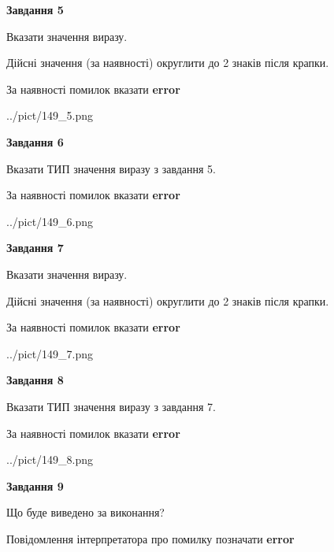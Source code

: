 \documentclass[11pt, ukrainian]{article}
\begin{document}
{\begin {large}
{\begin {center}\textbf{Завдання 5}\end {center}}\par
Вказати значення виразу. \par
Дійсні значення (за наявності) округлити до 2 знаків після крапки. \par
За наявності помилок вказати \textbf{error}

\begin{center}
	{../pict/149_5.png}
\end{center}
\newpage

{\begin {center}\textbf{Завдання 6}\end {center}}\par
Вказати ТИП значення виразу з завдання 5. \par
За наявності помилок вказати \textbf{error}

\begin{center}
	{../pict/149_6.png}
\end{center}
\newpage

{\begin {center}\textbf{Завдання 7}\end {center}}\par
Вказати значення виразу. \par
Дійсні значення (за наявності) округлити до 2 знаків після крапки. \par
За наявності помилок вказати \textbf{error}

\begin{center}
	{../pict/149_7.png}
\end{center}
\newpage

{\begin {center}\textbf{Завдання 8}\end {center}}\par
Вказати ТИП значення виразу з завдання 7. \par
За наявності помилок вказати \textbf{error}

\begin{center}
	{../pict/149_8.png}
\end{center}
\newpage

{\begin {center}\textbf{Завдання 9}\end {center}}\par
Що буде виведено за виконання? \par
Повідомлення інтерпретатора про помилку позначати \textbf{error}


\end{large}}
\end{document}
